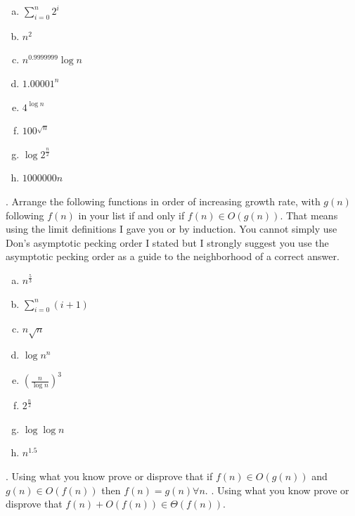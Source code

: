 \documentclass[12pt]{article}
\begin{document}
\begin{enumerate}[a)]
\item $\sum\limits_{i = 0}^{n} 2^i$\\
\item $n^2$\\
\item $n^{0.9999999}\log{n}$\\
\item $1.00001^n$\\
\item $4^{\log{n}}$\\
\item $100^{\sqrt{n}}$\\
\item $\log{2^{\frac{n}{2}}}$\\
\item $1000000n$\\
\end{enumerate}
\newpage
{}. Arrange the following functions in order of increasing growth rate, with $g(n)$ following $f(n)$ in your list if and only if $f(n) \in O(g(n))$. That means using the limit definitions I gave you or by induction. You cannot simply use Don's asymptotic pecking order I stated but I strongly suggest you use the asymptotic pecking order as a guide to the neighborhood of a correct answer.\\
\begin{enumerate}[a)]
\item  $n^{\frac{5}{3}}$\\
\item $\sum\limits_{i = 0}^{n} (i + 1)$\\
\item $n\sqrt{n}$\\
\item $\log{n^n}$\\
\item $(\frac{n}{\log{n}})^3$\\
\item  $2^{\frac{n}{2}}$\\
\item  $\log{\log{n}}$\\
\item  $n^{1.5}$\\
\end{enumerate}
\newpage
{}. Using what you know prove or disprove that  if $f(n) \in O(g(n)) $ and $g(n) \in O(f(n))$ then $f(n) = g(n) \forall n$.
\newpage
{}. Using what you know prove or disprove that $f(n) + O(f(n)) \in \Theta(f(n))$.
\end{document}
